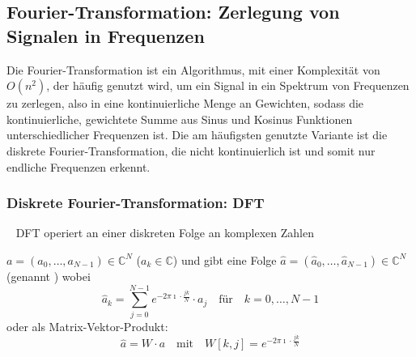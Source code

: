 \subsection{Fourier-Transformation: Zerlegung von Signalen in Frequenzen}
Die Fourier-Transformation ist ein Algorithmus, mit einer Komplexität von \(O\left(n^2\right) \), der häufig genutzt wird, um ein Signal in ein Spektrum von Frequenzen zu zerlegen, also in eine kontinuierliche Menge an Gewichten, sodass die kontinuierliche, gewichtete Summe aus Sinus und Kosinus Funktionen unterschiedlicher Frequenzen ist. Die am häufigsten genutzte Variante ist die diskrete Fourier-Transformation, die nicht kontinuierlich ist und somit nur endliche Frequenzen erkennt.

\subsubsection{\textbf{Diskrete Fourier-Transformation: DFT}}\label{sec:DFT}~\newline
DFT operiert an einer diskreten Folge an komplexen Zahlen

\(a = (a_0,\dots,a_{N-1}) \in \mathbb{C}^N\) (\(a_k \in \mathbb{C}\)) und gibt eine Folge
\(\hat{a} = (\hat{a}_0,\dots,\hat{a}_{N-1}) \in \mathbb{C}^N\) (genannt )
wobei \[\hat{a}_k = \sum_{j=0}^{N-1}e^{-2\pi \imath\cdot\frac{jk}{N}}\cdot a_j \quad \text{für}\quad k = 0,\dots,N-1\] oder als Matrix-Vektor-Produkt:
\[\hat{a} = W\cdot a \quad \text{mit} \quad W[k,j] = e^{-2\pi \imath \cdot\frac{jk}{N}}\]

